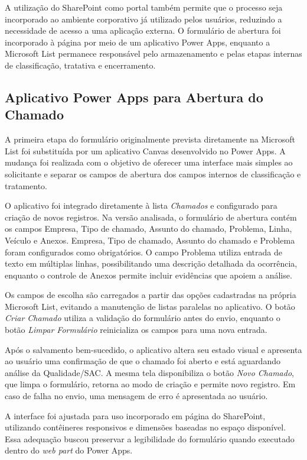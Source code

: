 A utilização do SharePoint como portal também permite que o
processo seja incorporado ao ambiente corporativo já
utilizado pelos usuários, reduzindo a necessidade de
acesso a uma aplicação externa. O formulário de abertura
foi incorporado à página por meio de um aplicativo Power
Apps, enquanto a Microsoft List permanece responsável pelo
armazenamento e pelas etapas internas de classificação,
tratativa e encerramento.

\subsection{Aplicativo Power Apps para Abertura do Chamado}

A primeira etapa do formulário originalmente prevista
diretamente na Microsoft List foi substituída por um
aplicativo Canvas desenvolvido no Power Apps. A mudança foi
realizada com o objetivo de oferecer uma interface mais
simples ao solicitante e separar os campos de abertura dos
campos internos de classificação e tratamento.

O aplicativo foi integrado diretamente à lista
\textit{Chamados} e configurado para criação de novos
registros. Na versão analisada, o formulário de abertura
contém os campos Empresa, Tipo de chamado, Assunto do
chamado, Problema, Linha, Veículo e Anexos. Empresa, Tipo
de chamado, Assunto do chamado e Problema foram
configurados como obrigatórios. O campo Problema utiliza
entrada de texto em múltiplas linhas, possibilitando uma
descrição detalhada da ocorrência, enquanto o controle de
Anexos permite incluir evidências que apoiem a análise.

Os campos de escolha são carregados a partir das opções
cadastradas na própria Microsoft List, evitando a
manutenção de listas paralelas no aplicativo. O botão
\textit{Criar Chamado} utiliza a validação do formulário
antes do envio, enquanto o botão \textit{Limpar Formulário}
reinicializa os campos para uma nova entrada.

Após o salvamento bem-sucedido, o aplicativo altera seu
estado visual e apresenta ao usuário uma confirmação de que
o chamado foi aberto e está aguardando análise da
Qualidade/SAC. A mesma tela disponibiliza o botão
\textit{Novo Chamado}, que limpa o formulário, retorna ao
modo de criação e permite novo registro. Em caso de falha
no envio, uma mensagem de erro é apresentada ao usuário.

A interface foi ajustada para uso incorporado em página do
SharePoint, utilizando contêineres responsivos e dimensões
baseadas no espaço disponível. Essa adequação buscou
preservar a legibilidade do formulário quando executado
dentro do \textit{web part} do Power Apps.

